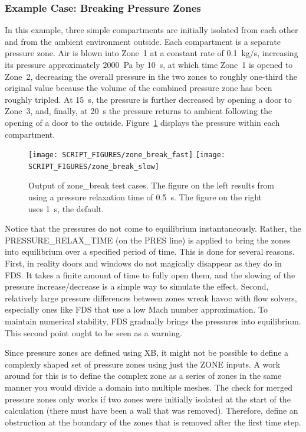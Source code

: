 \documentclass[11pt]{book}
\begin{document}
\subsubsection{Example Case: Breaking Pressure Zones}
\label{zone_break_slow}
\label{zone_break_fast}

In this example, three simple compartments are initially isolated from each other and from the ambient environment outside. Each compartment is a separate pressure zone. Air is blown into Zone~1 at a constant rate of 0.1~kg/s, increasing its pressure approximately 2000~Pa by 10~s, at which time Zone~1 is opened to Zone~2, decreasing the overall pressure in the two zones to roughly one-third the original value because the volume of the combined pressure zone has been roughly tripled. At 15~s, the pressure is further decreased by opening a door to Zone~3, and, finally, at 20~s the pressure returns to ambient following the opening of a door to the outside. Figure~\ref{zone_break} displays the pressure within each compartment.
\begin{figure}[ht]
\texttt{[image: SCRIPT\_FIGURES/zone\_break\_fast]}
\texttt{[image: SCRIPT\_FIGURES/zone\_break\_slow]}
\caption[Results of the {\ct zone\_break} test cases]{Output of {\ct zone\_break} test cases. The figure on the left results from using a pressure relaxation time of 0.5~s. The
figure on the right uses 1~s, the default.}
\label{zone_break}
\end{figure}
Notice that the pressures do not come to equilibrium instantaneously. Rather, the {\ct PRESSURE\_RELAX\_TIME} (on the {\ct PRES} line) is applied to bring the zones
into equilibrium over a specified period of time. This is done for several reasons. First, in reality doors and windows do not magically disappear as they do in FDS. It takes
a finite amount of time to fully open them, and the slowing of the pressure increase/decrease is a simple way to simulate the effect.
Second, relatively large pressure differences between zones wreak havoc with flow solvers, especially ones like FDS that
use a low Mach number approximation. To maintain numerical stability, FDS gradually brings the pressures into equilibrium. This second point ought to be seen as a warning.

Since pressure zones are defined using {\ct XB}, it might not be possible to define a complexly shaped set of pressure zones using just the {\ct ZONE} inputs.  A work around for this is to define the complex zone as a series of zones in the same manner you would divide a domain into multiple meshes.  The check for merged pressure zones only works if two zones were initially isolated at the start of the calculation (there must have been a wall that was removed). Therefore, define an obstruction at the boundary of the zones that is removed after the first time step.
\end{document}
